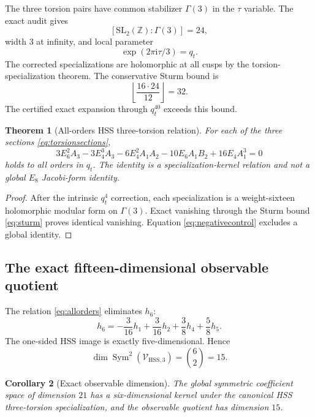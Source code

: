 \documentclass[11pt]{article}
\newtheorem{theorem}{Theorem}[section]
\newtheorem{corollary}[theorem]{Corollary}
\theoremstyle{definition}
\theoremstyle{remark}
\newcommand{\ii}{\mathrm{i}}
\newcommand{\cV}{\mathcal{V}}
\newcommand{\Sym}{\operatorname{Sym}}
\begin{document}
The three torsion pairs have common stabilizer $\Gamma(3)$ in the $\tau$ variable.  The exact audit gives
\[
[\mathrm{SL}_2(\mathbb Z):\Gamma(3)]=24,
\]
width $3$ at infinity, and local parameter
\[
\exp(2\pi\ii\tau/3)=q_t.
\]
The corrected specializations are holomorphic at all cusps by the torsion-specialization theorem.  The conservative Sturm bound is
\begin{equation}\label{eq:sturm}
\left\lfloor\frac{16\cdot24}{12}\right\rfloor=32.
\end{equation}
The certified exact expansion through $q_t^{40}$ exceeds this bound.

\begin{theorem}[All-orders HSS three-torsion relation]\label{thm:torsionrelation}
For each of the three sections \eqref{eq:torsionsections},
\begin{equation}\label{eq:allorders}
3E_6^2A_3-3E_4^3A_3-6E_4^2A_1A_2
-10E_6A_1B_2+16E_4A_1^3=0
\end{equation}
holds to all orders in $q_t$.  The identity is a specialization-kernel relation and not a global $E_8$ Jacobi-form identity.
\end{theorem}

\begin{proof}
After the intrinsic $q_t^4$ correction, each specialization is a weight-sixteen holomorphic modular form on $\Gamma(3)$.  Exact vanishing through the Sturm bound \eqref{eq:sturm} proves identical vanishing.  Equation \eqref{eq:negativecontrol} excludes a global identity.
\end{proof}

\subsection{The exact fifteen-dimensional observable quotient}

The relation \eqref{eq:allorders} eliminates $h_6$:
\begin{equation}\label{eq:h6elim}
h_6=-\frac{3}{16}h_1+\frac{3}{16}h_2+\frac38h_4+\frac58h_5.
\end{equation}
The one-sided HSS image is exactly five-dimensional.  Hence
\begin{equation}\label{eq:dim15}
\dim\Sym^2(\cV_{\mathrm{HSS},3})
=\binom{6}{2}=15.
\end{equation}

\begin{corollary}[Exact observable dimension]\label{cor:15}
The global symmetric coefficient space of dimension $21$ has a six-dimensional kernel under the canonical HSS three-torsion specialization, and the observable quotient has dimension $15$.
\end{corollary}
\end{document}
